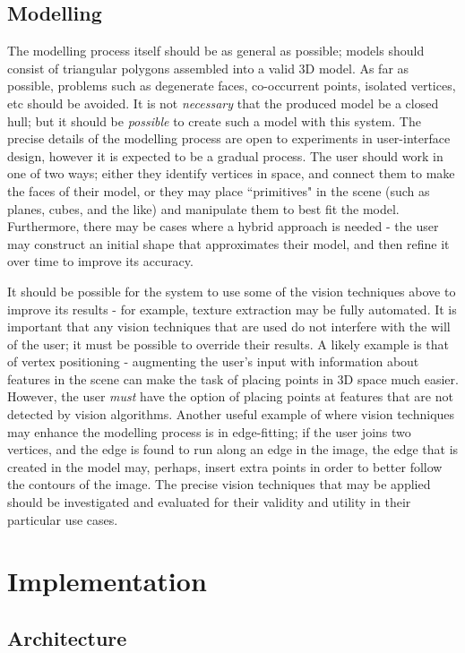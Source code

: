 \documentclass[a4paper,10pt]{article}
\begin{document}
\subsection{Modelling}
\label{approachmodel}
The modelling process itself should be as general as possible; models should consist of triangular polygons assembled into a valid 3D model. As far as possible, problems such as degenerate faces, co-occurrent points, isolated vertices, etc should be avoided. It is not \textit{necessary} that the produced model be a closed hull; but it should be \textit{possible} to create such a model with this system. The precise details of the modelling process are open to experiments in user-interface design, however it is expected to be a gradual process. The user should work in one of two ways; either they identify vertices in space, and connect them to make the faces of their model, or they may place ``primitives" in the scene (such as planes, cubes, and the like) and manipulate them to best fit the model. Furthermore, there may be cases where a hybrid approach is needed - the user may construct an initial shape that approximates their model, and then refine it over time to improve its accuracy.

It should be possible for the system to use some of the vision techniques above to improve its results - for example, texture extraction may be fully automated. It is important that any vision techniques that are used do not interfere with the will of the user; it must be possible to override their results. A likely example is that of vertex positioning - augmenting the user's input with information about features in the scene can make the task of placing points in 3D space much easier. However, the user \textit{must} have the option of placing points at features that are not detected by vision algorithms. Another useful example of where vision techniques may enhance the modelling process is in edge-fitting; if the user joins two vertices, and the edge is found to run along an edge in the image, the edge that is created in the model may, perhaps, insert extra points in order to better follow the contours of the image. The precise vision techniques that may be applied should be investigated and evaluated for their validity and utility in their particular use cases.

\section{Implementation}
\subsection{Architecture}
\end{document}
